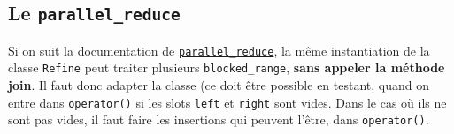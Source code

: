 \documentclass[10pt]{article}
\begin{document}
\subsection{Le \texttt{parallel\_reduce}} Si on suit la documentation de
\href{https://software.intel.com/en-us/node/506154}{\texttt{parallel\_reduce}},
la même instantiation de la classe \texttt{Refine} peut traiter
plusieurs \texttt{blocked\_range}, \textbf{sans appeler la méthode
  join}.
Il faut donc adapter la classe (ce doit être possible en testant, quand
on entre dans \texttt{operator()} si les slots \texttt{left} et
\texttt{right} sont vides. Dans le cas où ils ne sont pas vides, il
faut faire les insertions qui peuvent l'être, dans \texttt{operator()}.
\end{document}
